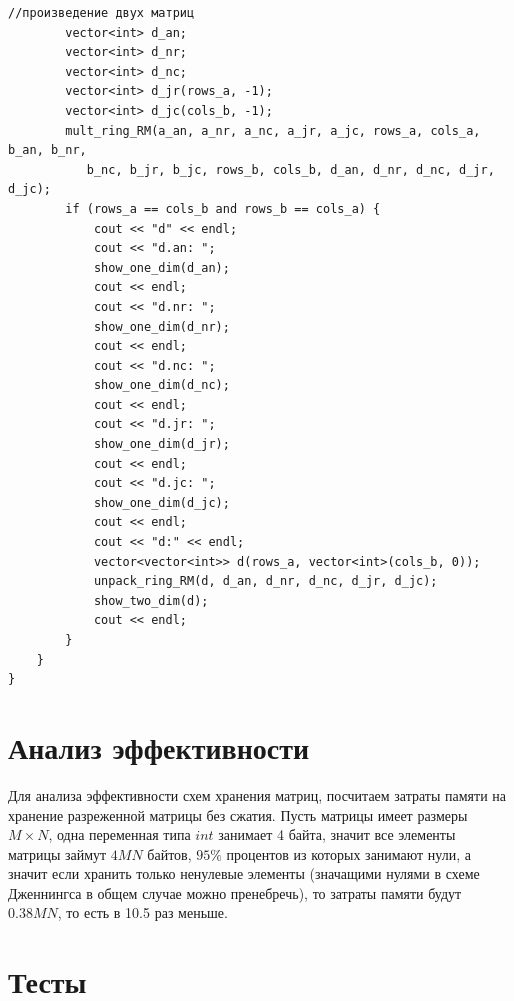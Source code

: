 \documentclass[12pt, a4paper]{article}
\begin{document}
\begin{lstlisting}[caption={Исходный код}, label={lst:label1}]
        //произведение двух матриц
        vector<int> d_an;
        vector<int> d_nr;
        vector<int> d_nc;
        vector<int> d_jr(rows_a, -1);
        vector<int> d_jc(cols_b, -1);
        mult_ring_RM(a_an, a_nr, a_nc, a_jr, a_jc, rows_a, cols_a, b_an, b_nr, 
           b_nc, b_jr, b_jc, rows_b, cols_b, d_an, d_nr, d_nc, d_jr, d_jc);
        if (rows_a == cols_b and rows_b == cols_a) {
            cout << "d" << endl;
            cout << "d.an: ";
            show_one_dim(d_an);
            cout << endl;
            cout << "d.nr: ";
            show_one_dim(d_nr);
            cout << endl;
            cout << "d.nc: ";
            show_one_dim(d_nc);
            cout << endl;
            cout << "d.jr: ";
            show_one_dim(d_jr);
            cout << endl;
            cout << "d.jc: ";
            show_one_dim(d_jc);
            cout << endl;
            cout << "d:" << endl;
            vector<vector<int>> d(rows_a, vector<int>(cols_b, 0));
            unpack_ring_RM(d, d_an, d_nr, d_nc, d_jr, d_jc);
            show_two_dim(d);
            cout << endl;
        }
    }
}
\end{lstlisting}
\newpage
\section{Анализ эффективности}
Для анализа эффективности схем хранения матриц, посчитаем затраты памяти на 
хранение разреженной матрицы без сжатия. Пусть матрицы имеет размеры $M \times 
N$, одна переменная типа $int$ занимает 4 байта, значит все элементы матрицы 
займут $4MN$ байтов, $95\%$ процентов из которых занимают нули, а значит если 
хранить только ненулевые элементы (значащими нулями в схеме Дженнингса в общем 
случае можно пренебречь), то затраты памяти будут $0.38MN$, то есть в 10.5 раз 
меньше.
\newpage
\section{Тесты}
\end{document}
